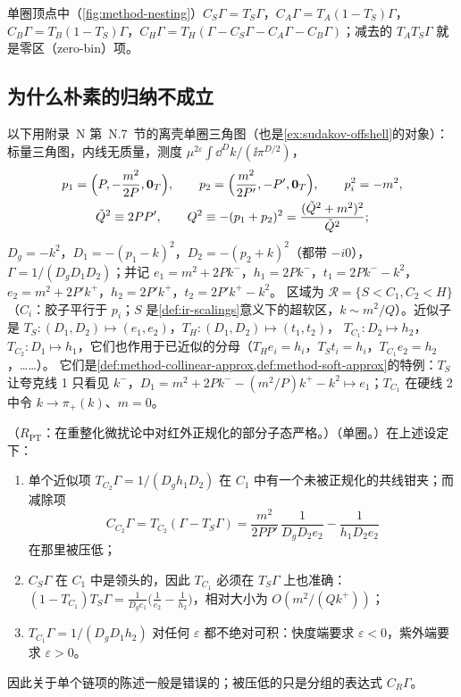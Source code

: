 单圈顶点中（\cref{fig:method-nesting}）$C_S\Gamma=T_S\Gamma$，$C_A\Gamma=T_A(1-T_S)\Gamma$，$C_B\Gamma=T_B(1-T_S)\Gamma$，$C_H\Gamma=T_H(\Gamma-C_S\Gamma-C_A\Gamma-C_B\Gamma)$；减去的 $T_AT_S\Gamma$ 就是零区（zero-bin）项。

\subsection{为什么朴素的归纳不成立}

以下用附录~N 第~N.7~节的离壳单圈三角图（也是\cref{ex:sudakov-offshell}的对象）：标量三角图，内线无质量，测度 $\mu^{2\varepsilon}\int\dd^Dk/(\ii\pi^{D/2})$，
\begin{equation}\label{eq:method-tri-kin}
\begin{gathered}
p_1=\Bigl(P,-\frac{m^2}{2P},\mathbf 0_T\Bigr),\qquad p_2=\Bigl(\frac{m^2}{2P'},-P',\mathbf 0_T\Bigr),\qquad p_i^2=-m^2,\\
\tilde Q^2\equiv2PP',\qquad Q^2\equiv-(p_1+p_2)^2=\frac{(\tilde Q^2+m^2)^2}{\tilde Q^2} ;
\end{gathered}
\end{equation}
$D_g=-k^2$，$D_1=-(p_1-k)^2$，$D_2=-(p_2+k)^2$（都带 $-i0$），$\Gamma=1/(D_gD_1D_2)$；并记 $e_1=m^2+2Pk^-$，$h_1=2Pk^-$，$t_1=2Pk^--k^2$，$e_2=m^2+2P'k^+$，$h_2=2P'k^+$，$t_2=2P'k^+-k^2$。
区域为 $\mathcal R=\{S<C_1,C_2<H\}$（$C_i$：胶子平行于 $p_i$；$S$ 是\cref{def:ir-scalings}意义下的超软区，$k\sim m^2/Q$）。近似子是 $T_S:(D_1,D_2)\mapsto(e_1,e_2)$，$T_H:(D_1,D_2)\mapsto(t_1,t_2)$，
$T_{C_1}:D_2\mapsto h_2$，$T_{C_2}:D_1\mapsto h_1$，它们也作用于已近似的分母（$T_He_i=h_i$，$T_St_i=h_i$，$T_{C_1}e_2=h_2$，……）。
它们是\cref{def:method-collinear-approx,def:method-soft-approx}的特例：$T_S$ 让夸克线 1 只看见 $k^-$，$D_1=m^2+2Pk^--(m^2/P)k^+-k^2\mapsto e_1$；$T_{C_1}$ 在硬线 2 中令 $k\to\pi_+(k)$、$m=0$。

\begin{example}\label{ex:method-naive-induction}
（$R_{\mathrm{PT}}$：在重整化微扰论中对红外正规化的部分子态严格。）（单圈。）在上述设定下：
\begin{enumerate}[label=(\alph*),leftmargin=2em,itemsep=1pt,topsep=2pt]
\item 单个近似项 $T_{C_2}\Gamma=1/(D_gh_1D_2)$ 在 $C_1$ 中有一个未被正规化的共线钳夹；而减除项
  \begin{equation}\label{eq:method-CC2}
  C_{C_2}\Gamma=T_{C_2}(\Gamma-T_S\Gamma)=\frac{m^2}{2PP'}\,\frac1{D_gD_2e_2}-\frac1{h_1D_2e_2}
  \end{equation}
  在那里被压低；
\item $C_S\Gamma$ 在 $C_1$ 中是领头的，因此 $T_{C_1}$ 必须在 $T_S\Gamma$ 上也准确：$(1-T_{C_1})T_S\Gamma=\frac1{D_ge_1}\bigl(\frac1{e_2}-\frac1{h_2}\bigr)$，相对大小为 $O(m^2/(Qk^+))$；
\item $T_{C_1}\Gamma=1/(D_gD_1h_2)$ 对任何 $\varepsilon$ 都不绝对可积：快度端要求 $\varepsilon<0$，紫外端要求 $\varepsilon>0$。
\end{enumerate}
因此关于单个链项的陈述一般是错误的；被压低的只是分组的表达式 $C_R\Gamma$。
\end{example}

